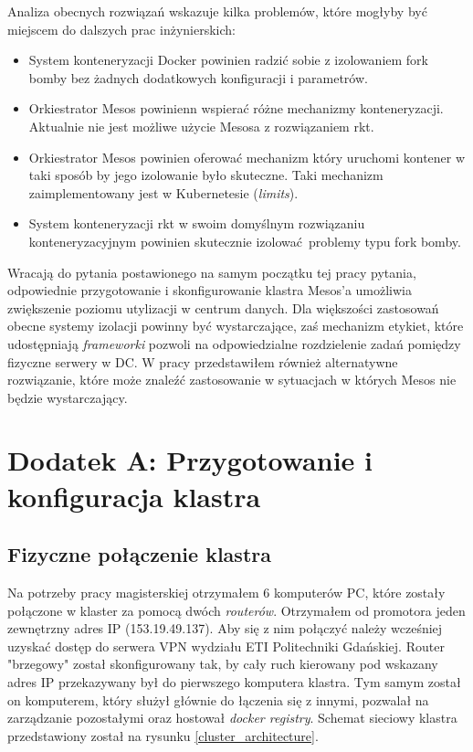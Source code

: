 \documentclass[10pt,a4paper,titlepage,twoside]{report}
\begin{document}
Analiza obecnych rozwiązań wskazuje kilka problemów, które mogłyby być miejscem do dalszych prac inżynierskich:
\begin{itemize}
\item System konteneryzacji Docker powinien radzić sobie z izolowaniem fork bomby bez żadnych dodatkowych konfiguracji i parametrów.
\item Orkiestrator Mesos powinienn wspierać różne mechanizmy konteneryzacji. Aktualnie nie jest możliwe użycie Mesosa z rozwiązaniem rkt.
\item Orkiestrator Mesos powinien oferować mechanizm który uruchomi kontener w taki sposób by jego izolowanie było skuteczne. Taki mechanizm zaimplementowany jest w Kubernetesie (\textit{limits}).
\item System konteneryzacji rkt w swoim domyślnym rozwiązaniu konteneryzacyjnym powinien skutecznie izolować problemy typu fork bomby.
\end{itemize}

Wracają do pytania postawionego na samym początku tej pracy pytania, odpowiednie przygotowanie i skonfigurowanie klastra Mesos'a umożliwia zwiększenie poziomu utylizacji w centrum danych. Dla większości zastosowań obecne systemy izolacji powinny być wystarczające, zaś mechanizm etykiet, które udostępniają \textit{frameworki} pozwoli na odpowiedzialne rozdzielenie zadań pomiędzy fizyczne serwery w DC. W pracy przedstawiłem również alternatywne rozwiązanie, które może znaleźć zastosowanie w sytuacjach w których Mesos nie będzie wystarczający.

\newpage
\chapter{Dodatek A: Przygotowanie i konfiguracja klastra}
\section{Fizyczne połączenie klastra}

Na potrzeby pracy magisterskiej otrzymałem 6 komputerów PC, które zostały połączone w klaster za pomocą dwóch \textit{routerów}. Otrzymałem od promotora jeden zewnętrzny adres IP (153.19.49.137). Aby się z nim połączyć należy wcześniej uzyskać dostęp do serwera VPN wydziału ETI Politechniki Gdańskiej. Router "brzegowy" został skonfigurowany tak, by cały ruch kierowany pod wskazany adres IP przekazywany był do pierwszego komputera klastra. Tym samym został on komputerem, który służył głównie do łączenia się z innymi, pozwalał na zarządzanie pozostałymi oraz hostował \textit{docker registry}. Schemat sieciowy klastra przedstawiony został na rysunku \ref{cluster_architecture}.
\end{document}
